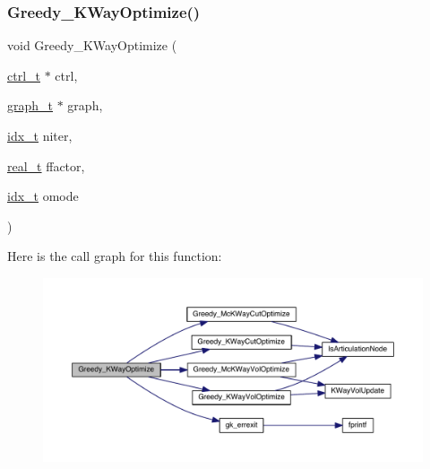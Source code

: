 \subsubsection{\texorpdfstring{Greedy\+\_\+\+K\+Way\+Optimize()}{Greedy\_KWayOptimize()}}
{\footnotesize\ttfamily void Greedy\+\_\+\+K\+Way\+Optimize (\begin{DoxyParamCaption}\item[{\hyperlink{a00742}{ctrl\+\_\+t} $\ast$}]{ctrl,  }\item[{\hyperlink{a00734}{graph\+\_\+t} $\ast$}]{graph,  }\item[{\hyperlink{a00876_aaa5262be3e700770163401acb0150f52}{idx\+\_\+t}}]{niter,  }\item[{\hyperlink{a00876_a1924a4f6907cc3833213aba1f07fcbe9}{real\+\_\+t}}]{ffactor,  }\item[{\hyperlink{a00876_aaa5262be3e700770163401acb0150f52}{idx\+\_\+t}}]{omode }\end{DoxyParamCaption})}

Here is the call graph for this function\+:\nopagebreak
\begin{figure}[H]
\begin{center}
\leavevmode
\includegraphics[width=350pt]{a00945_a063b67f1b75662342f8db5aefba11cc5_cgraph}
\end{center}
\end{figure}
\mbox{\label{a00945_af249da13cad4e148e2a6efcacad5d5da}} 
